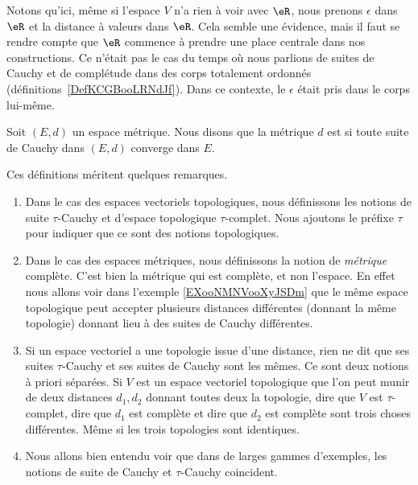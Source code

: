 Notons qu'ici, même si l'espace \( V\) n'a rien à voir avec \( \eR\), nous prenons \( \epsilon\) dans \( \eR\) et la distance à valeurs dans \( \eR\). Cela semble une évidence, mais il faut se rendre compte que \( \eR\) commence à prendre une place centrale dans nos constructions. Ce n'était pas le cas du temps où nous parlions de suites de Cauchy et de complétude dans des corps totalement ordonnés (définitions~\ref{DefKCGBooLRNdJf}). Dans ce contexte, le \( \epsilon\) était pris dans le corps lui-même.

\begin{definition}       \label{DEFooHBAVooKmqerL}
    Soit \( (E,d)\) un espace métrique. Nous disons que la métrique \( d\) est  si toute suite de Cauchy dans \( (E,d)\) converge dans \( E\).
\end{definition}

\begin{normaltext}
    Ces définitions méritent quelques remarques.
    \begin{enumerate}
        \item
            Dans le cas des espaces vectoriels topologiques, nous définissons les notions de suite \( \tau\)-Cauchy et d'espace topologique \( \tau\)-complet. Nous ajoutons le préfixe \( \tau\) pour indiquer que ce sont des notions topologiques.
        \item
            Dans le cas des espaces métriques, nous définissons la notion de \emph{métrique} complète. C'est bien la métrique qui est complète, et non l'espace. En effet nous allons voir dans l'exemple \ref{EXooNMNVooXyJSDm} que le même espace topologique peut accepter plusieurs distances différentes (donnant la même topologie) donnant lieu à des suites de Cauchy différentes.
        \item
            Si un espace vectoriel a une topologie issue d'une distance, rien ne dit que ses suites \( \tau\)-Cauchy et ses suites de Cauchy sont les mêmes. Ce sont deux notions à priori séparées. Si \( V\) est un espace vectoriel topologique que l'on peut munir de deux distances \( d_1, d_2\) donnant toutes deux la topologie, dire que \( V\) est \( \tau\)-complet, dire que \( d_1\) est complète et dire que \( d_2\) est complète sont trois choses différentes. Même si les trois topologies sont identiques.
        \item
            Nous allons bien entendu voir que dans de larges gammes d'exemples, les notions de suite de Cauchy et \( \tau\)-Cauchy coincident.
    \end{enumerate}
\end{normaltext}

